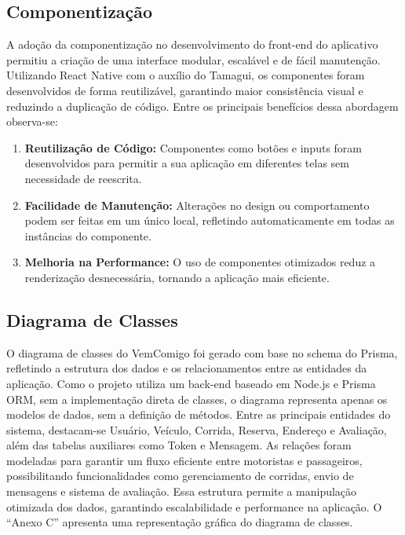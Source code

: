 \subsection{Componentização}

A adoção da componentização no desenvolvimento do front-end do aplicativo permitiu a criação de uma interface modular, escalável e de fácil manutenção. Utilizando React Native com o auxílio do Tamagui, os componentes foram desenvolvidos de forma reutilizável, garantindo maior consistência visual e reduzindo a duplicação de código. Entre os principais benefícios dessa abordagem observa-se:

\begin{enumerate}
	\item \textbf{Reutilização de Código:} Componentes como botões e inputs foram desenvolvidos para permitir a sua aplicação em diferentes telas sem necessidade de reescrita.
	\item \textbf{Facilidade de Manutenção:} Alterações no design ou comportamento podem ser feitas em um único local, refletindo automaticamente em todas as instâncias do componente.
	\item \textbf{Melhoria na Performance:} O uso de componentes otimizados reduz a renderização desnecessária, tornando a aplicação mais eficiente.
\end{enumerate}

\subsection{Diagrama de Classes}

O diagrama de classes do VemComigo foi gerado com base no schema do Prisma, refletindo a estrutura dos dados e os relacionamentos entre as entidades da aplicação. Como o projeto utiliza um back-end baseado em Node.js e Prisma ORM, sem a implementação direta de classes, o diagrama representa apenas os modelos de dados, sem a definição de métodos. Entre as principais entidades do sistema, destacam-se Usuário, Veículo, Corrida, Reserva, Endereço e Avaliação, além das tabelas auxiliares como Token e Mensagem. As relações foram modeladas para garantir um fluxo eficiente entre motoristas e passageiros, possibilitando funcionalidades como gerenciamento de corridas, envio de mensagens e sistema de avaliação. Essa estrutura permite a manipulação otimizada dos dados, garantindo escalabilidade e performance na aplicação. O ``Anexo C'' apresenta uma representação gráfica do diagrama de classes.

